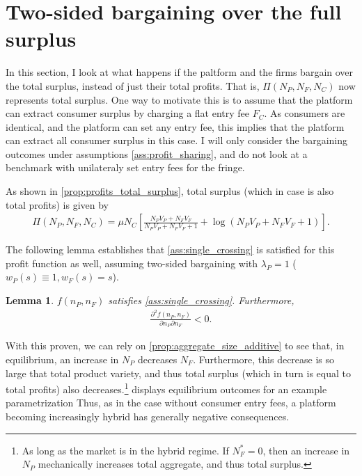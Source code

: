 \documentclass[a4paper]{article}
\newtheorem{lemma}{Lemma}
\begin{document}
\section{Two-sided bargaining over the full surplus}
\label{sec:total_welfare_one_sided}

In this section, I look at what happens if the paltform and the firms bargain over the total surplus, instead of just their total profits.
That is, $\Pi(N_P, N_F, N_C)$ now represents total surplus.
One way to motivate this is to assume that the platform can extract consumer surplus by charging a flat entry fee $F_C$.
As consumers are identical, and the platform can set any entry fee, this implies that the platform can extract all consumer surplus in this case.
I will only consider the bargaining outcomes under assumptions \cref{ass:profit_sharing}, and do not look at a benchmark with unilateraly set entry fees for the fringe.

As shown in \cref{prop:profits_total_surplus}, total surplus (which in case is also total profits) is given by
\begin{align*}
    \Pi(N_P, N_F, N_C) = \mu N_C \left[ \frac{N_P V_P + N_F V_F}{N_P V_P + N_F V_F + 1} + \log(N_P V_P + N_F V_F + 1) \right].
\end{align*}

The following lemma establishes that \cref{ass:single_crossing} is satisfied for this profit function as well, assuming two-sided bargaining with $\lambda_P = 1$ ($w_P(s) \equiv 1, w_F(s) = s$).
\begin{lemma}
    \label{lem:profit_assumptions_total_surplus}
    $f(n_P, n_F)$ satisfies \cref{ass:single_crossing}.
    Furthermore,
    \begin{align*}
        \frac{\partial^2 f(n_P, n_F)}{\partial n_P \partial n_F} < 0.
    \end{align*}
\end{lemma}

With this proven, we can rely on \cref{prop:aggregate_size_additive} to see that, in equilibrium, an increase in $N_P$ decreases $N_F$.
Furthermore, this decrease is so large that total product variety, and thus total surplus (which in turn is equal to total profits) also decreases.\footnote{
    As long as the market is in the hybrid regime.
    If $N_F^* = 0$, then an increase in $N_P$ mechanically increases total aggregate, and thus total surplus.
}
 displays equilibrium outcomes for an example parametrization
Thus, as in the case without consumer entry fees, a platform becoming increasingly hybrid has generally negative consequences.
\end{document}

